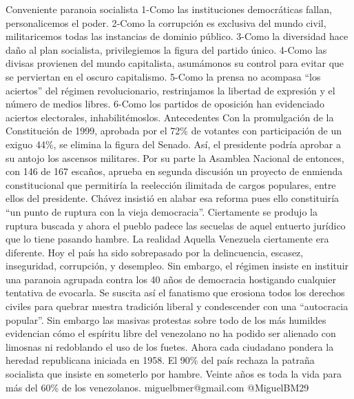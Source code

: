 \documentclass{article}%
\begin{document}
\newline%
%
Conveniente paranoia socialista%
\newline%
%
1{-}Como las instituciones democráticas fallan, personalicemos el poder. 2{-}Como la corrupción es exclusiva del mundo civil, militaricemos todas las instancias de dominio público. 3{-}Como la diversidad hace daño al plan socialista, privilegiemos la figura del partido único. 4{-}Como las divisas provienen del mundo capitalista, asumámonos su control para evitar que se perviertan en el oscuro capitalismo. 5{-}Como la prensa no acompasa “los aciertos” del régimen revolucionario, restrinjamos la libertad de expresión y el número de medios libres. 6{-}Como los partidos de oposición han evidenciado aciertos electorales, inhabilitémoslos.%
\newline%
%
Antecedentes%
\newline%
%
Con la promulgación de la Constitución de 1999, aprobada por el 72\% de votantes con participación de un exiguo 44\%, se elimina la figura del Senado. Así, el presidente podría aprobar a su antojo los ascensos militares. Por su parte la Asamblea Nacional de entonces, con 146 de 167 escaños, aprueba en segunda discusión un proyecto de enmienda constitucional que permitiría la reelección ilimitada de cargos populares, entre ellos del presidente. Chávez insistió en alabar esa reforma pues ello constituiría “un punto de ruptura con la vieja democracia”. Ciertamente se produjo la ruptura buscada y ahora el pueblo padece las secuelas de aquel entuerto jurídico que lo tiene pasando hambre.%
\newline%
%
La realidad%
\newline%
%
Aquella Venezuela ciertamente era diferente. Hoy el país ha sido sobrepasado por la delincuencia, escasez, inseguridad, corrupción, y desempleo. Sin embargo, el régimen insiste en instituir una paranoia agrupada contra los 40 años de democracia hostigando cualquier tentativa de evocarla. Se suscita así el fanatismo que erosiona todos los derechos civiles para quebrar nuestra tradición liberal y condescender con una “autocracia popular”.%
\newline%
%
Sin embargo las masivas protestas sobre todo de los más humildes evidencian cómo el espíritu libre del venezolano no ha podido ser alienado con limosnas ni redoblando el uso de los fuetes. Ahora cada ciudadano pondera la heredad republicana iniciada en 1958. El 90\% del país rechaza la patraña socialista que insiste en someterlo por hambre. Veinte años es toda la vida para más del 60\% de los venezolanos.%
\newline%
%
miguelbmer@gmail.com%
\newline%
%
@MiguelBM29%
\newline%
%
\end{document}
